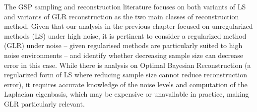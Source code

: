 The GSP sampling and reconstruction literature focuses on both variants of LS and variants of GLR reconstruction as the two main classes of reconstruction method. 
Given that our analysis in the previous chapter focused on unregularized methods (LS) under high noise, it is pertinent to consider a regularized method (GLR) under noise -- given regularised methods are particularly suited to high noise environments -- and identify whether decreasing sample size can decrease error in this case. While there is analysis on Optimal Bayesian Reconstruction \cite{chamon2017greedy} (a regularized form of LS where reducing sample size cannot reduce reconstruction error), it requires accurate knowledge of the noise levels and computation of the Laplacian eigenbasis, which may be expensive or unavailable in practice, making GLR particularly relevant.

